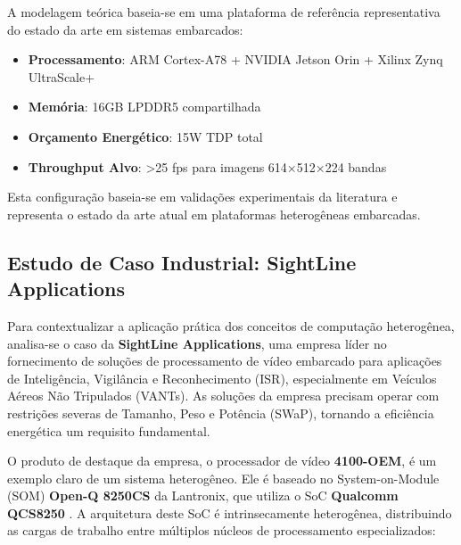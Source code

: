A modelagem teórica baseia-se em uma plataforma de referência representativa do estado da arte em sistemas embarcados:
\begin{itemize}
\item \textbf{Processamento}: ARM Cortex-A78 + NVIDIA Jetson Orin + Xilinx Zynq UltraScale+
\item \textbf{Memória}: 16GB LPDDR5 compartilhada
\item \textbf{Orçamento Energético}: 15W TDP total
\item \textbf{Throughput Alvo}: >25 fps para imagens 614×512×224 bandas
\end{itemize}

Esta configuração baseia-se em validações experimentais da literatura \cite{diaz2019, hwang2011} e representa o estado da arte atual em plataformas heterogêneas embarcadas.

\subsection{Estudo de Caso Industrial: SightLine Applications}

Para contextualizar a aplicação prática dos conceitos de computação heterogênea, analisa-se o caso da \textbf{SightLine Applications}, uma empresa líder no fornecimento de soluções de processamento de vídeo embarcado para aplicações de Inteligência, Vigilância e Reconhecimento (ISR), especialmente em Veículos Aéreos Não Tripulados (VANTs). As soluções da empresa precisam operar com restrições severas de Tamanho, Peso e Potência (SWaP), tornando a eficiência energética um requisito fundamental.

O produto de destaque da empresa, o processador de vídeo \textbf{4100-OEM}, é um exemplo claro de um sistema heterogêneo. Ele é baseado no System-on-Module (SOM) \textbf{Open-Q 8250CS} da Lantronix, que utiliza o SoC \textbf{Qualcomm QCS8250} \cite{lantronix2023openq}. A arquitetura deste SoC é intrinsecamente heterogênea, distribuindo as cargas de trabalho entre múltiplos núcleos de processamento especializados:

